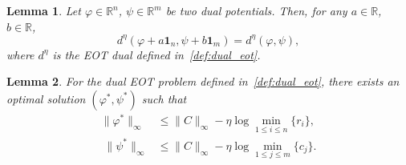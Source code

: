 \documentclass[10pt,a4paper]{amsart}
\newtheorem{lemma}{Lemma}
\newcommand{\R}{\mathbb{R}}
\newcommand{\one}{\mathbf{1}}
\begin{document}
\begin{lemma}\label{lem:logsumexp_additive}
    Let $\varphi\in\R^n$, $\psi\in \R^m $ be two dual potentials. Then, for any $a\in\R$, $b\in\R$,
    \[
    d^{\eta }(\varphi + a\one_n,\psi+b\one_m)=d^{\eta }(\varphi,\psi),
    \]
    where $d^{\eta }$ is the EOT dual defined in~\eqref{def:dual_eot}.
\end{lemma}

\begin{lemma}\label{lem:dual_infty_bound}
    For the dual EOT problem defined in~\eqref{def:dual_eot}, there exists an optimal solution $(\varphi^*,\psi^*)$ such that
    \begin{align*}
        \|\varphi^*\|_\infty&\leq \|C\|_\infty -\eta \log\underset{1\leq i\leq n}\min\{r_i\},\\
        \;\|\psi^*\|_\infty&\leq \|C\|_\infty -\eta \log\underset{1\leq j\leq m}\min\{c_j\}.
    \end{align*}
\end{lemma}
\end{document}
